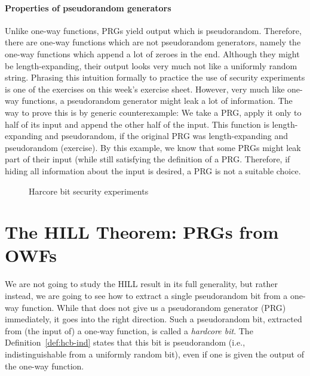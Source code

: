 \documentclass[a4paper,table,dvipsnames]{article}
\theoremstyle{definition}
\begin{document}
\paragraph{Properties of pseudorandom generators}
Unlike one-way functions, PRGs yield output which is pseudorandom. Therefore, there are one-way functions which are not pseudorandom
generators, namely the one-way functions which append a lot of zeroes in the end. Although they might be length-expanding, their output
looks very much not like a uniformly random string. Phrasing this intuition formally to practice the use of security experiments is one
of the exercises on this week's exercise sheet. However, very much like one-way functions, a pseudorandom generator might leak a lot of information. The way to prove this is by generic counterexample: We take a PRG, apply it only to half of its input and append the other
half of the input. This function is length-expanding and pseudorandom, if the original PRG was length-expanding and pseudorandom (exercise).
By this example, we know that some PRGs might leak part of their input (while still satisfying the definition of a PRG. Therefore, if
hiding all information about the input is desired, a PRG is not a suitable choice.

\begin{wrapfigure}{R}{0.45\textwidth}
\vspace{-0.5cm}
\begin{center}
  \begin{pchstack}
  \pchspace
  \end{pchstack}
  \end{center}
\caption{\label{fig:hb}Harcore bit security experiments}
\end{wrapfigure}

\section{The HILL Theorem: PRGs from OWFs}
We are not going to study the HILL result in its full generality, but rather instead, we are going to see how to extract a single pseudorandom bit from a one-way function. While that does not give us a pseudorandom generator (PRG) immediately, it goes into the right direction. Such a pseudorandom bit, extracted from (the input of) a one-way function, is called a \emph{hardcore bit}. The Definition~\ref{def:hcb-ind} states that this bit is pseudorandom (i.e., indistinguishable from a uniformly random bit), even if one is given the output of the one-way function.
\end{document}
